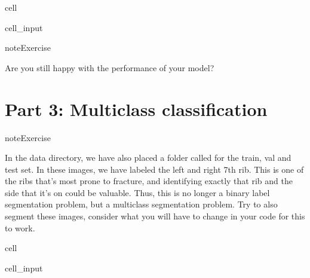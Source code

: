 \documentclass[letterpaper,10pt,english]{jupyterBook}
\begin{document}
\begin{sphinxuseclass}{cell}\begin{sphinxVerbatimInput}

\begin{sphinxuseclass}{cell_input}
\begin{sphinxVerbatim}[commandchars=\\\{\}]
 
\end{sphinxVerbatim}

\end{sphinxuseclass}\end{sphinxVerbatimInput}

\end{sphinxuseclass}
\begin{sphinxadmonition}{note}{Exercise}

\sphinxAtStartPar
Are you still happy with the performance of your model?
\end{sphinxadmonition}


\chapter{Part 3: Multiclass classification}
\label{\detokenize{notebooks/Tutorial3_Segmentation/Tutorial3_Segmentation_student:part-3-multiclass-classification}}
\begin{sphinxadmonition}{note}{Exercise}

\sphinxAtStartPar
In the data directory, we have also placed a folder called  for the train, val and test set. In these images, we have labeled the left and right 7th rib. This is one of the ribs that’s most prone to fracture, and identifying exactly that rib and the side that it’s on could be valuable. Thus, this is no longer a binary label segmentation problem, but a multiclass segmentation problem. Try to also segment these images, consider what you will have to change in your code for this to work.
\end{sphinxadmonition}

\begin{sphinxuseclass}{cell}\begin{sphinxVerbatimInput}

\begin{sphinxuseclass}{cell_input}
\begin{sphinxVerbatim}[commandchars=\\\{\}]
\end{sphinxVerbatim}

\end{sphinxuseclass}\end{sphinxVerbatimInput}

\end{sphinxuseclass}
\sphinxstepscope
\end{document}
